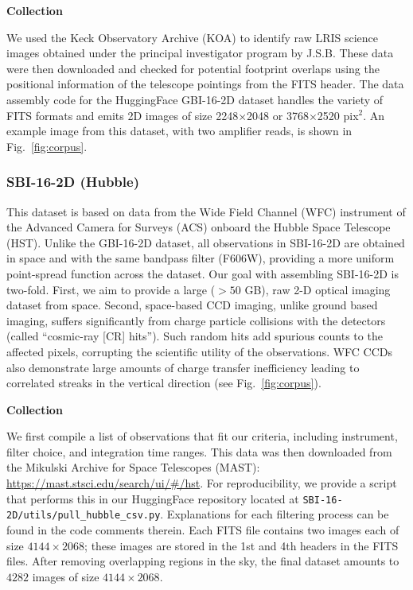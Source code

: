 \textbf{Collection}

We used the Keck Observatory Archive (KOA) to identify raw LRIS science images obtained under the principal investigator program by J.S.B. These data were then downloaded and checked for potential footprint overlaps using the positional information of the telescope pointings from the FITS header. The data assembly code for the HuggingFace GBI-16-2D dataset handles the variety of FITS formats and emits 2D images of size 2248$\times$2048 or 3768$\times$2520 pix$^{2}$. An example image from this dataset, with two amplifier reads, is shown in Fig.\ \ref{fig:corpus}.

\subsubsection{SBI-16-2D (Hubble)}
This dataset is based on data from the Wide Field Channel (WFC) instrument of the Advanced Camera for Surveys (ACS) onboard the Hubble Space Telescope (HST). Unlike the GBI-16-2D dataset, all observations in SBI-16-2D are obtained in space and with the same bandpass filter (F606W), providing a more uniform point-spread function across the dataset.
Our goal with assembling SBI-16-2D is two-fold. First, we aim to provide a large ($>50$ GB), raw 2-D optical imaging dataset from space. Second, space-based CCD imaging, unlike ground based imaging, suffers significantly from charge particle collisions with the detectors (called ``cosmic-ray [CR] hits''). Such random hits add spurious counts to the affected pixels, corrupting the scientific utility of the observations. WFC CCDs also demonstrate large amounts of charge transfer inefficiency leading to correlated streaks in the vertical direction (see Fig.\ \ref{fig:corpus}).

\textbf{Collection}

We first compile a list of observations that fit our criteria, including instrument, filter choice, and integration time ranges.  This data was then downloaded from the Mikulski Archive for Space Telescopes (MAST): \url{https://mast.stsci.edu/search/ui/#/hst}. For reproducibility, we provide a script that performs this in our HuggingFace repository located at \texttt{SBI-16-2D/utils/pull\_hubble\_csv.py}. Explanations for each filtering process can be found in the code comments therein.  Each FITS file contains two images each of size $4144 \times 2068$; these images are stored in the 1st and 4th headers in the FITS files. After removing overlapping regions in the sky, the final dataset amounts to $4282$ images of size $4144 \times 2068$.  

